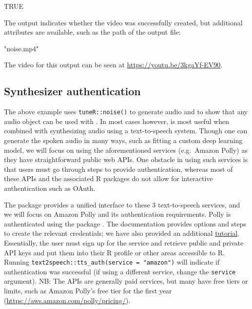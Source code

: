 \begin{example}
[1] TRUE
\end{example}

The output indicates whether the video was successfully created, but
additional attributes are available, such as the path of the output
file:


\begin{example}
[1] "noise.mp4"
\end{example}

The video for this output can be seen at
\url{https://youtu.be/3kgaYf-EV90}.

\hypertarget{synthesizer-authentication}{%
\subsection{Synthesizer
authentication}\label{synthesizer-authentication}}

The above example uses \texttt{tuneR::noise()} to generate audio and to
show that any audio object can be used with . In most cases
however,  is most useful when combined with synthesizing audio
using a text-to-speech system. Though one can generate the spoken audio
in many ways, such as fitting a custom deep learning model, we will
focus on using the aforementioned services (e.g.~Amazon Polly) as they
have straightforward public web APIs. One obstacle in using such
services is that users must go through steps to provide authentication,
whereas most of these APIs and the associated R packages do not allow
for interactive authentication such as OAuth.

The  package provides a unified interface to these 3
text-to-speech services, and we will focus on Amazon Polly and its
authentication requirements. Polly is authenticated using the
 package \citep{aws.signature}. The
 documentation provides options and steps to create
the relevant credentials; we have also provided an additional
\href{http://seankross.com/2017/05/02/Access-Amazon-Web-Services-in-R.html}{tutorial}.
Essentially, the user must sign up for the service and retrieve public
and private API keys and put them into their R profile or other areas
accessible to R. Running
\texttt{text2speech::tts\_auth(service\ =\ "amazon")} will indicate if
authentication was successful (if using a different service, change the
\texttt{service} argument). NB: The APIs are generally paid services,
but many have free tiers or limits, such as Amazon Polly's free tier for
the first year (\url{https://aws.amazon.com/polly/pricing/}).

